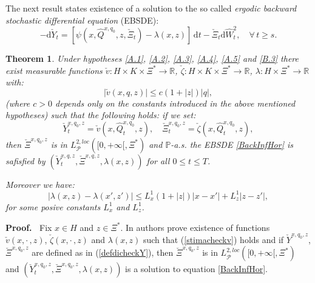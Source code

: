 \documentclass[reqno,a4paper,11 pt]{article}
\def \E {\mathbb{E}}
\def \P {\mathcal{P}}
\newtheorem{theorem}{Theorem}[section]
\newcommand{\rmd}{\mathrm{d}}
\numberwithin{equation}{section}
\def\Dim{\noindent\hbox{{\bf Proof.}$\;\; $}}          %
\begin{document}
The next result states existence of a solution to the so called {\em ergodic backward stochastic differential equation} (EBSDE):
\begin{equation}
\label{BackInfHor}
- \rmd \check{Y}_t=[\psi(x,\hat{Q}^{x,q_0},z,\check{\Xi}_t)-\lambda(x,z)]\,\rmd t - \check{\Xi}_t \rmd \hat{ W}_t^{2}, \quad \forall \, t\geq s.
\end{equation}
\begin{theorem}\label{Teolambda}
Under hypotheses  \ref{A.1},  \ref{A.2},  \ref{A.3}, \ref{A.4}, \ref{A.5} and  \ref{B.3} there exist measurable functions $\check{v}: H\times K \times \Xi^* \rightarrow \mathbb{R}$,
$\check{\zeta}: H\times K \times \Xi^*\rightarrow \mathbb{R}$, $\lambda: H \times \Xi^*\rightarrow \mathbb{R}$  with:
\begin{equation}\label{stimacheckv}|\check{v}(x,q,z)| \leq c(1+|z|)|q|,\end{equation}
(where  $c>0$  depends only on the constants introduced in the above mentioned hypotheses) such that the following holds: if we set: 
\begin{equation}\label{defdicheckY} \check{Y}^{x,q_0,z}_t= \check{v}(x,\hat{Q}^{x,q_0}_t,z), \quad \check{\Xi}^{x,q_0,z}_t= \check{\zeta}(x,\hat{Q}^{x,q_0}_t,z),\end{equation}
then  $\check{\Xi}^{x,q_0,z}$ is in $L^{2,loc}_\P([0,+\infty [,\Xi^*)$ and  $\mathbb{P}$-a.s. the EBSDE \eqref{BackInfHor} is safisfied by  $(\check{Y}^{x,q,z}_t, \check{\Xi}^{x,q,z}, \lambda(x,z))$ for all $ 0\leq t \leq T$. 
 


Moreover we have:
\begin{equation}\label{LipLambda}
|\lambda(x,z) -\lambda( x',z')| \leq {L^1_x} (1+|z|)|x-x'| +{L^1_z}|z-z'|,
\end{equation}
for some posive constants $L^1_x$ and $L^1_z$.
\end{theorem}
\Dim 
Fix $x\in H$ and $z\in \Xi^*$. In 
 \cite[Theorem 4.4  and Corollary 5.9]{FuHuTes} authors prove existence of functions  $\check{v}(x,\cdot\,,z)$, $\check{\zeta}(x, \cdot\,,z)$ and $\lambda(x,z)$ such that (\ref{stimacheckv}) holds and if  $\check{Y}^{x,q_0,z}$, $\check{\Xi}^{x,q_0,z}$ are defined as in (\ref{defdicheckY}), then $\check{\Xi}^{x,q_0,z}$ is in $L^{2,loc}_\P([0,+\infty[,\Xi^*)$ and $(\check{Y}^{x,q_0,z}_t, \check{\Xi}^{x,q_0,z}, \lambda(x,z))$  is a solution to equation   \eqref{BackInfHor}.
\end{document}
